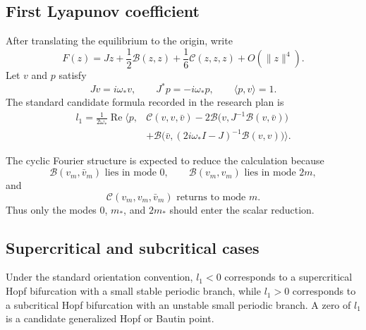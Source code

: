 \documentclass[11pt, reqno]{amsart}
\theoremstyle{definition}
\theoremstyle{remark}
\newcommand{\Ree}{\operatorname{Re}}
\newcommand{\dd}{\,\mathrm{d}}
\begin{document}

\subsection{First Lyapunov coefficient}

After translating the equilibrium to the origin, write
\begin{equation}
\label{eq:Taylor-vector-field}
    F(z)
    =
    Jz
    +\frac12\mathcal B(z,z)
    +\frac16\mathcal C(z,z,z)
    +O(\|z\|^4).
\end{equation}
Let $v$ and $p$ satisfy
\[
    Jv=i\omega_*v,
    \qquad
    J^*p=-i\omega_*p,
    \qquad
    \langle p,v\rangle=1.
\]
The standard candidate formula recorded in the research plan is
\begin{align}
\label{eq:first-Lyapunov}
    l_1
    =
    \frac{1}{2\omega_*}
    \Ree\Big\langle p,
    &\mathcal C(v,v,\bar v)
    -2\mathcal B\bigl(v,J^{-1}\mathcal B(v,\bar v)\bigr)
    \\
    &+\mathcal B\bigl(\bar v,(2i\omega_*I-J)^{-1}
    \mathcal B(v,v)\bigr)
    \Big\rangle.
\end{align}

The cyclic Fourier structure is expected to reduce the calculation because
\[
    \mathcal B(v_m,\bar v_m)\text{ lies in mode }0,
    \qquad
    \mathcal B(v_m,v_m)\text{ lies in mode }2m,
\]
and
\[
    \mathcal C(v_m,v_m,\bar v_m)\text{ returns to mode }m.
\]
Thus only the modes $0$, $m_*$, and $2m_*$ should enter the scalar reduction.


\subsection{Supercritical and subcritical cases}

Under the standard orientation convention, $l_1<0$ corresponds to a
supercritical Hopf bifurcation with a small stable periodic branch, while
$l_1>0$ corresponds to a subcritical Hopf bifurcation with an unstable small
periodic branch.  A zero of $l_1$ is a candidate generalized Hopf or Bautin
point.

\end{document}
